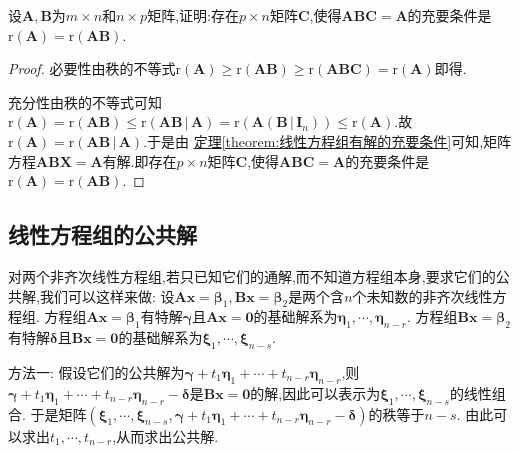 \documentclass[../../main.tex]{subfiles}%
\begin{document}
\begin{proposition}
设\(\boldsymbol{A},\boldsymbol{B}\)为\(m\times n\)和\(n\times p\)矩阵,证明:存在\(p\times n\)矩阵\(\boldsymbol{C}\),使得\(\boldsymbol{A}\boldsymbol{B}\boldsymbol{C}=\boldsymbol{A}\)的充要条件是\(\mathrm{r}(\boldsymbol{A})=\mathrm{r}(\boldsymbol{A}\boldsymbol{B})\).
\end{proposition}
\begin{proof}

必要性由秩的不等式\(\mathrm{r}(\boldsymbol{A})\geqslant \mathrm{r}(\boldsymbol{A}\boldsymbol{B})\geqslant \mathrm{r}(\boldsymbol{A}\boldsymbol{B}\boldsymbol{C})=\mathrm{r}(\boldsymbol{A})\)即得. 

充分性由秩的不等式可知\(\mathrm{r}\left( \boldsymbol{A} \right) =\mathrm{r}\left( \boldsymbol{AB} \right) \leqslant \mathrm{r}\left( \boldsymbol{AB}\,|\,\boldsymbol{A} \right) =\mathrm{r}\left( \boldsymbol{A}\left( \boldsymbol{B}\,|\,\boldsymbol{I}_n \right) \right) \leqslant \mathrm{r}\left( \boldsymbol{A} \right)\).故$\mathrm{r}\left( \boldsymbol{A} \right) =\mathrm{r}\left( \boldsymbol{AB}\,|\,\boldsymbol{A} \right)$.于是由
\hyperref[theorem:线性方程组有解的充要条件]{定理\ref{theorem:线性方程组有解的充要条件}}可知,矩阵方程$\boldsymbol{ABX}=\boldsymbol{A}$有解.即存在\(p\times n\)矩阵\(\boldsymbol{C}\),使得\(\boldsymbol{A}\boldsymbol{B}\boldsymbol{C}=\boldsymbol{A}\)的充要条件是\(\mathrm{r}(\boldsymbol{A})=\mathrm{r}(\boldsymbol{A}\boldsymbol{B})\).

\end{proof}

\subsection{线性方程组的公共解}

对两个非齐次线性方程组,若只已知它们的通解,而不知道方程组本身,要求它们的公共解,我们可以这样来做:
设\(\boldsymbol{A}\boldsymbol{x}=\boldsymbol{\beta}_1,\boldsymbol{B}\boldsymbol{x}=\boldsymbol{\beta}_2\)是两个含\(n\)个未知数的非齐次线性方程组. 方程组\(\boldsymbol{A}\boldsymbol{x}=\boldsymbol{\beta}_1\)有特解\(\boldsymbol{\gamma}\)且\(\boldsymbol{A}\boldsymbol{x}=\boldsymbol{0}\)的基础解系为\(\boldsymbol{\eta}_1,\cdots,\boldsymbol{\eta}_{n - r}\). 方程组\(\boldsymbol{B}\boldsymbol{x}=\boldsymbol{\beta}_2\)有特解\(\boldsymbol{\delta}\)且\(\boldsymbol{B}\boldsymbol{x}=\boldsymbol{0}\)的基础解系为\(\boldsymbol{\xi}_1,\cdots,\boldsymbol{\xi}_{n - s}\).

{\color{blue}方法一:} 假设它们的公共解为\(\boldsymbol{\gamma}+t_1\boldsymbol{\eta}_1+\cdots+t_{n - r}\boldsymbol{\eta}_{n - r}\),则\(\boldsymbol{\gamma}+t_1\boldsymbol{\eta}_1+\cdots+t_{n - r}\boldsymbol{\eta}_{n - r}-\boldsymbol{\delta}\)是\(\boldsymbol{B}\boldsymbol{x}=\boldsymbol{0}\)的解,因此可以表示为\(\boldsymbol{\xi}_1,\cdots,\boldsymbol{\xi}_{n - s}\)的线性组合. 于是矩阵\((\boldsymbol{\xi}_1,\cdots,\boldsymbol{\xi}_{n - s},\boldsymbol{\gamma}+t_1\boldsymbol{\eta}_1+\cdots+t_{n - r}\boldsymbol{\eta}_{n - r}-\boldsymbol{\delta})\)的秩等于\(n - s\). 由此可以求出\(t_1,\cdots,t_{n - r}\),从而求出公共解.
\end{document}
